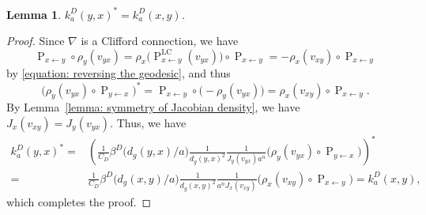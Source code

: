 \documentclass[a4paper,oneside,12pt]{amsart}
\theoremstyle{plain}
\newtheorem{lemma}[theorem]{Lemma}
\theoremstyle{definition}
\theoremstyle{remark}
\newcommand{\paralleltransport}[2]{\operatorname{P}_{#2 \gets #1}}
\newcommand{\paralleltransportLC}[2]{\paralleltransport{#1}{#2}^{\mathrm{LC}}}
\newcommand{\cliffordmultiplication}{\rho}
\newcommand{\cutoff}{\beta}
\newcommand{\cutoffDirac}{\cutoff^D}
\newcommand{\integralkernel}{k}
\newcommand{\kernelDirac}{\integralkernel_a^D}
\begin{document}
\begin{lemma}\label{lemma: symmetry of Dirac kernel}
  $\kernelDirac(y,x)^* = \kernelDirac(x,y)$.
\end{lemma}
\begin{proof}
  Since $\nabla$ is a Clifford connection, we have
  \begin{equation}
    \paralleltransport{y}{x} \circ \cliffordmultiplication_y(v_{yx}) = \cliffordmultiplication_x\big(\paralleltransportLC{y}{x}(v_{yx})\big) \circ \paralleltransport{y}{x} = - \cliffordmultiplication_x(v_{xy}) \circ \paralleltransport{y}{x}
  \end{equation}
  by \eqref{equation: reversing the geodesic}, and thus
  \begin{equation}
    \big( \cliffordmultiplication_y(v_{yx}) \circ \paralleltransport{x}{y} \big)^* = \paralleltransport{y}{x} \circ \big( -\cliffordmultiplication_y(v_{yx}) \big) = \cliffordmultiplication_x(v_{xy}) \circ \paralleltransport{y}{x}.
  \end{equation}
  By Lemma~\ref{lemma: symmetry of Jacobian density}, we have $J_x(v_{xy}) = J_y(v_{yx})$.
  Thus, we have
  \begin{equation}
    \begin{aligned}
    \kernelDirac(y,x)^* ={}& \left( \frac{1}{C_D} \cutoffDirac\big(d_g(y,x)/a\big) \frac{1}{d_g(y,x)^2} \frac{1}{J_y(v_{yx})a^n} \big( \cliffordmultiplication_y(v_{yx}) \circ \paralleltransport{x}{y} \big) \right)^* \\
    ={}& \frac{1}{C_D} \cutoffDirac\big(d_g(x,y)/a\big) \frac{1}{d_g(x,y)^2} \frac{1}{a^nJ_x(v_{xy})} \big( \cliffordmultiplication_x(v_{xy}) \circ \paralleltransport{y}{x} \big) = \kernelDirac(x,y),
    \end{aligned}
  \end{equation}
  which completes the proof.
\end{proof}
\end{document}
